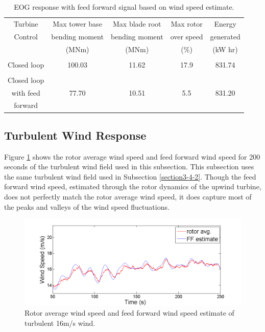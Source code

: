 \begin{table}
\centering
\begin{tabular}{ c | c c c c }
\hline
\hline
Turbine			& Max tower	base		& Max blade	root		& Max rotor				& Energy\\
Control			& bending moment		& bending moment		& over speed					& generated\\
						& (MNm)  				& (MNm)				& ($\%$)	& (kW hr)\\

\hline
  &  &   &  &  \\
Closed loop  & 100.03 & 11.62  &17.9 & 831.74 \\
 &  &   &  & \\
Closed loop  &  &   &  &  \\
with feed  & 77.70 & 10.51  & 5.5 & 831.20 \\
forward  &  &   &  &  \\
\hline
\hline
\end{tabular}
\caption{EOG response with feed forward signal based on wind speed estimate.}
\label{Table3-4}
\end{table}

\subsection{Turbulent Wind Response} \label{section3-5-2}
Figure \ref{fig3-30} shows the rotor average wind speed and feed forward wind speed for 200 seconds of the turbulent wind field used in this subsection. This subsection uses the same turbulent wind field used in Subsection \ref{section3-4-2}. Though the feed forward wind speed, estimated through the rotor dynamics of the upwind turbine, does not perfectly match the rotor average wind speed, it does capture most of the peaks and valleys of the wind speed fluctuations. 

\begin{figure}[htbp]
	\centering
		\includegraphics[trim = {1cm 0 2cm 0}, clip, width = \linewidth]{Figures/ch3Figures/fig3-30.png}
		
	\caption{Rotor average wind speed and feed forward wind speed estimate of turbulent 16m/s wind.}
	\label{fig3-30}
\end{figure}

